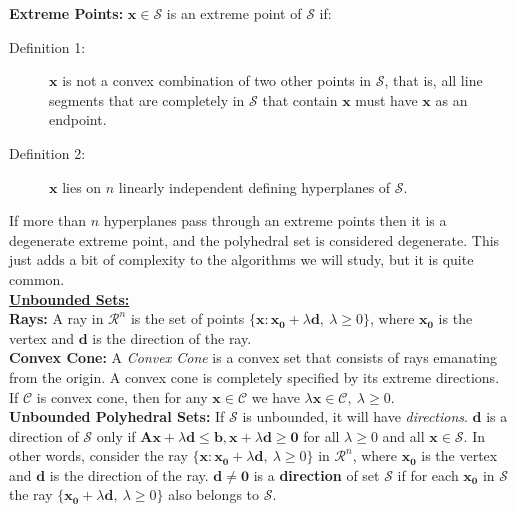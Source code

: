 {\bf Extreme Points:} $\mathbf{x} \in \mathcal{S}$ is an extreme point of $\mathcal{S}$ if:
\begin{description}
\item[Definition 1:] $\mathbf{x}$ is not a convex combination of two other points in $\mathcal{S}$, that is, all line segments that are completely in $\mathcal{S}$ that contain $\mathbf{x}$ must have $\mathbf{x}$ as an endpoint.
\item[Definition 2:] $\mathbf{x}$ lies on $n$ linearly independent defining hyperplanes of $\mathcal{S}$.
\end{description}


If more than $n$ hyperplanes pass through an extreme points then it is a degenerate extreme point, and the polyhedral set is considered degenerate. This just adds a bit of complexity to the algorithms we will study, but it is quite common. \\
  

\underline {\bf Unbounded Sets:} \\ 

{\bf Rays:} A ray in $\mathcal{R}^n$ is the set of points $\{\mathbf{x}: \mathbf{x_0} + \lambda\mathbf{d},~ \lambda \ge 0\}$, where $\mathbf{x_0}$ is the vertex and $\mathbf{d}$ is the direction of the ray.\\


{\bf Convex Cone:} A {\it Convex Cone} is a convex set that consists of rays emanating from the origin.  A convex cone is completely specified by its extreme directions.  If $\mathcal{C}$ is convex cone, then for any $\mathbf{x} \in \mathcal{C}$ we have $\lambda \mathbf{x} \in \mathcal{C},~ \lambda \ge 0$. \\

{\bf Unbounded Polyhedral Sets:} If $\mathcal{S}$ is unbounded, it will have {\it directions}. $\mathbf{d}$ is a direction of $\mathcal{S}$ only if $\mathbf{A} \mathbf{x} + \lambda\mathbf{d} \le \mathbf{b}, \mathbf{x} + \lambda\mathbf{d} \ge \mathbf{0}$ for all $\lambda \ge 0$ and all $\mathbf{x} \in \mathcal{S}$.  In other words, consider the ray $\{\mathbf{x}: \mathbf{x_0} + \lambda\mathbf{d},~ \lambda \ge 0\}$ in $\mathcal{R}^n$, where $\mathbf{x_0}$ is the vertex and $\mathbf{d}$ is the direction of the ray. $\mathbf{d} \ne \mathbf{0}$ is a {\bf direction} of set $\mathcal{S}$ if for each $\mathbf{x_0}$ in $\mathcal{S}$ the ray $\{\mathbf{x_0} + \lambda\mathbf{d},~ \lambda \ge 0\}$ also belongs to $\mathcal{S}$. \\

